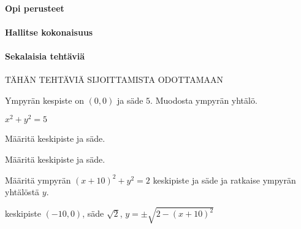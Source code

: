 \begin{tehtavasivu}

\paragraph*{Opi perusteet}

\paragraph*{Hallitse kokonaisuus}

\paragraph*{Sekalaisia tehtäviä}

TÄHÄN TEHTÄVIÄ SIJOITTAMISTA ODOTTAMAAN

\begin{tehtava}
Ympyrän kespiste on $(0,0)$ ja säde $5$. Muodosta ympyrän yhtälö.
\begin{vastaus}
$x^2+y^2=5$
\end{vastaus}
\end{tehtava}

\begin{tehtava}
Määritä keskipiste ja säde.
\begin{alakohdat}
\end{alakohdat}
\begin{vastaus}
\begin{alakohdat}
\end{alakohdat}
\end{vastaus}
\end{tehtava}

\begin{tehtava}
Määritä keskipiste ja säde.
\begin{alakohdat}
\end{alakohdat}
\begin{vastaus}
\begin{alakohdat}
\end{alakohdat}
\end{vastaus}
\end{tehtava}

\begin{tehtava}
Määritä ympyrän $(x+10)^2+y^2=2$ keskipiste ja säde ja ratkaise ympyrän yhtälöstä $y$. 
\begin{vastaus}
keskipiste $(-10,0)$, säde $\sqrt{2}$, $y=\pm\sqrt{2-(x+10)^2}$ 
\end{vastaus}
\end{tehtava}


\end{tehtavasivu}
